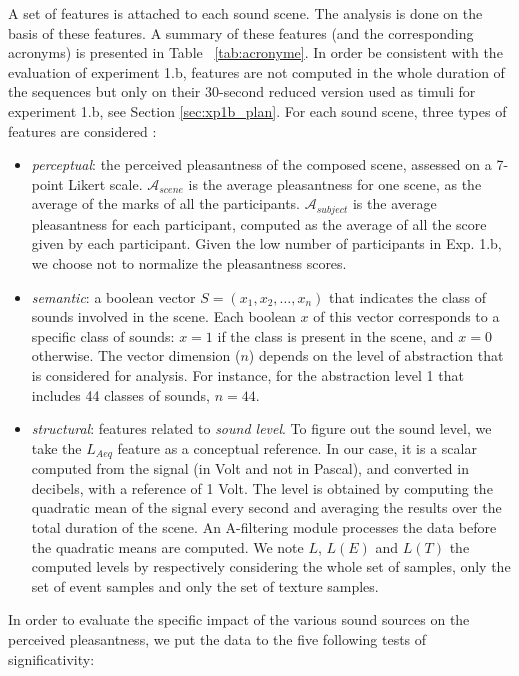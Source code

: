 \documentclass[twoside,twocolumn]{article}
\begin{document}
A set of features is attached to each sound scene. The analysis is done on the basis of these features. A summary of these features (and the corresponding acronyms) is presented in Table ~\ref{tab:acronyme}. In order be consistent with the evaluation of experiment 1.b, features are not computed in the whole duration of the sequences but only on their 30-second reduced version used as timuli for experiment 1.b, see Section \ref{sec:xp1b_plan}.
For each sound scene, three types of features are considered :
\begin{itemize}
\item \emph{perceptual}: the perceived pleasantness of the composed scene, assessed on a 7-point Likert scale. $\mathcal{A}_{scene}$ is the average pleasantness for one scene, as the average of the marks of all the participants. $\mathcal{A}_{subject}$ is the average pleasantness for each participant, computed as the average of all the score given by each participant. Given the low number of participants in Exp. 1.b, we choose not to normalize the pleasantness scores.
\item \emph{semantic}: a boolean vector $S = (x_1, x_2, \ldots, x_n)$ that indicates the class of sounds involved in the scene. Each boolean $x$ of this vector corresponds to a specific class of sounds: $x = 1$ if the class is present in the scene, and $x = 0$ otherwise. The vector dimension ($n$) depends on the level of abstraction that is considered for analysis. For instance, for the abstraction level 1 that includes 44 classes of sounds, $n = 44$.
\item \emph{structural}: features related to \emph{sound level}. To figure out the sound level, we take the $L_{Aeq}$ feature as a conceptual reference. In our case, it is a scalar computed from the  signal (in Volt and not in Pascal), and converted in decibels, with a reference of 1 Volt. The level is obtained by computing the quadratic mean of the signal every second and averaging the results over the total duration of the scene. An A-filtering module processes the data before the quadratic means are computed. We note $L$, $L(E)$ and $L(T)$ the computed levels by respectively considering the whole set of samples, only the set of event samples and only the set of texture samples.
\end{itemize}

In order to evaluate the specific impact of the various sound sources on the perceived pleasantness, we put the data to the five following tests of significativity:
\end{document}
